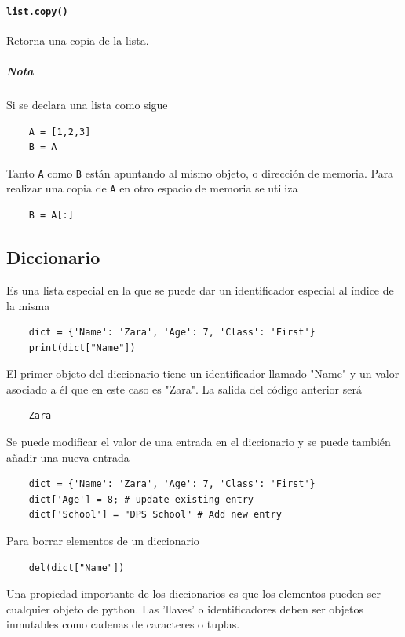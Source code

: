 \paragraph{\texttt{list.copy()}} Retorna una copia de la lista.

\subparagraph{Nota} Si se declara una lista como sigue
\begin{verbatim}
    A = [1,2,3]
    B = A
\end{verbatim}
Tanto \texttt{A} como \texttt{B} están apuntando al mismo objeto, o dirección de memoria. Para realizar una copia de \texttt{A} en otro espacio de memoria se utiliza

\begin{verbatim}
    B = A[:]
\end{verbatim}

\subsection{Diccionario}

Es una lista especial en la que se puede dar un identificador especial al índice de la misma

\begin{verbatim}
    dict = {'Name': 'Zara', 'Age': 7, 'Class': 'First'}
    print(dict["Name"])
\end{verbatim}

El primer objeto del diccionario tiene un identificador llamado "Name" y un valor asociado a él que en este caso es "Zara". La salida del código anterior será

\begin{verbatim}
    Zara
\end{verbatim}

Se puede modificar el valor de una entrada en el diccionario y se puede también añadir una nueva entrada

\begin{verbatim}
    dict = {'Name': 'Zara', 'Age': 7, 'Class': 'First'}
    dict['Age'] = 8; # update existing entry
    dict['School'] = "DPS School" # Add new entry
\end{verbatim}

Para borrar elementos de un diccionario 

\begin{verbatim}
    del(dict["Name"])
\end{verbatim}

Una propiedad importante de los diccionarios es que los elementos pueden ser cualquier objeto de python. Las 'llaves' o identificadores deben ser objetos inmutables como cadenas de caracteres o tuplas.

